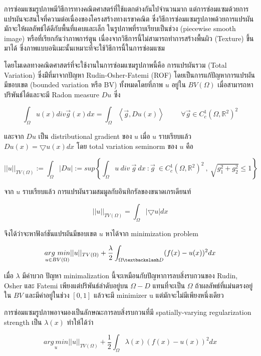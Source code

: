 \documentclass[hidelinks,a4paper,14pt]{article}
\numberwithin{equation}{section}							%
\begin{document}
{	การซ่อมแซมรูปภาพมีวิธีการทางคณิตศาสตร์ที่ใช้แตกต่างกันไปจำนวนมาก แต่การซ่อมแซมด้วยการแปรผันจะสนใจที่ความต่อเนื่องของโครงสร้างทางเรขาคณิต ซึ่งวิธีการซ่อมแซมรูปภาพด้วยการแปรผันมักจะให้ผลลัพธ์ได้ดีกับพื้นที่แคบและเล็ก ในรูปภาพที่ราบเรียบเป็นช่วง (piecewise smooth image) หรือที่เรียกกันว่าภาพการ์ตูน เนื่องจากวิธีการนี้ไม่สามารถทำการสร้างพื้นผิว (Texture) ขึ้นมาได้ \cite{ref:defination-of-variation-inpaint} ซึ่งภาพแบบอนิเมะนั้นเหมาะที่จะใช้วิธีการนี้ในการซ่อมแซม
	
	โดยโมเดลทางคณิตศาสตร์ที่จะใช้งานในการซ่อมแซมรูปภาพนี้คือ การแปรผันรวม (Total Variation)  ซึ่งม่ีที่มาจากปัญหา Rudin-Osher-Fatemi (ROF) โดยเป็นการแก้ปัญหาการแปรผันมีขอบเขต (bounded variation หรือ BV) ทั้งหมดโดยที่ภาพ $u$ อยู่ใน $BV(\Omega)$ เมื่อสามารถหาปริพันธ์ได้และจะมี Radon measure $Du$ ซึ่ง 
	
	$$\int_{\Omega}u(x) div \vec{g}(x) dx = \int_{\Omega} \left\langle\vec{g},Du(x) \right\rangle\hspace{1cm}\forall\vec{g} \in C_c^1(\Omega,\mathbb{R}^2)^2$$
	
	และจาก $Du$ เป็น distributional gradient ของ $u$ เมื่อ $u$ ราบเรียบแล้ว  $Du(x)= \bigtriangledown u(x)dx $
	โดย total variation seminorm ของ $u$ คือ 
	
	$$ ||u||_{TV(\Omega)} := \int_{\Omega} | Du | := sup{ \left \{ \int_{\Omega}  u \ div  \ \vec{g} \ dx \  : \vec{g} \  \in C_c^1(\Omega,\mathbb{R}^2)^2 \ , \ \sqrt{g_1^2+g_2^2} \leq 1 \right \} }  $$
	
	จาก $u$ ราบเรียบแล้ว การแปรผันรวมสมมูลกับอินทิกรัลของขนาดเกรเดียนท์ 
	
	$$ ||u||_{TV(\Omega)} = \int_{\Omega} | \bigtriangledown u | dx$$
	
	จึงได้ว่าจะหาฟังก์ชันแปรผันมีขอบเขต $u$ หาได้จาก minimization problem
	
	$$ \underset{u \in BV(\Omega)}{arg \ min} ||u||_{TV(\Omega)} + \frac{\lambda}{2} \int_{\Omega \textbackslash D} (f(x) - u(x))^2 dx$$
	
	เมื่อ $\lambda$ มีค่าบวก ปัญหา minimalization นี้จะเหมือนกับปัญหาการลบสิ่งรบกวนของ Rudin, Osher และ Fatemi เพียงแต่ปริพันธ์ลำดับอยู่บน $\Omega-D$  แทนที่จะเป็น $\Omega$ ถ้าผลลัพธ์ที่แม่นตรงอยู่ใน $BV$ และมีค่าอยู่ในช่วง $[0,1]$ แล้วจะมี minimizer u แต่มักจะไม่มีเพียงหนึ่งเดียว \cite{ref:splitbergman-denoise}
	
	การซ่อมแซมรูปภาพอาจมองเป็นลักษณะการลบสิ่งรบกวนที่มี spatially-varying regularization strength เป็น $\lambda(x)$ ทำให้ได้ว่า
	
		$$\underset{u}{{arg \ min}} ||u||_{TV(\Omega)} + \frac{1}{2} \int_{\Omega} \lambda(x)(f(x) - u(x))^2 dx$$
		
}
\end{document}
